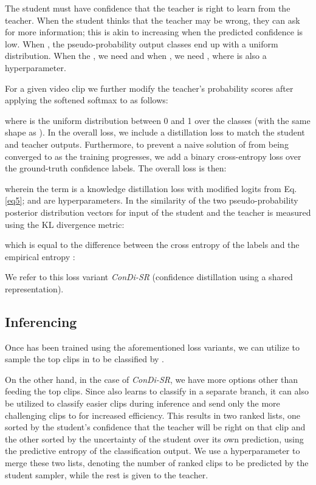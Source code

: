 \documentclass[a4paper,conference]{IEEEtran}
\begin{document}
The student must have confidence that the teacher is right to learn from the teacher. When the student thinks that the teacher may be wrong, they can ask for more information; this is akin to increasing  when the predicted confidence is low. When , the pseudo-probability output classes end up with a uniform distribution. When the , we need  and when , we need , where  is also a hyperparameter.

For a given video clip  we further modify the teacher's probability scores after applying the softened softmax to  as follows:




where  is the uniform distribution between 0 and 1 over the  classes (with the same shape as ). In the overall loss, we include a distillation loss  to match the student and teacher outputs. Furthermore, to prevent a naive solution of  from being converged to as the training progresses, we add a binary cross-entropy loss  over the ground-truth confidence labels. The overall loss is then:



wherein the  term is a knowledge distillation loss with modified logits from Eq. \ref{eq5};  and  are hyperparameters. In  the similarity of the two pseudo-probability posterior distribution vectors for input  of the student and the teacher is measured using the KL divergence metric:




which is equal to the difference between the cross entropy of the labels  and the empirical entropy :



We refer to this loss variant \textit{ConDi-SR} (confidence distillation using a shared representation).

\subsection{Inferencing}
\label{algorithmdetails}

Once  has been trained using the aforementioned loss variants, we can utilize  to sample the top  clips in  to be classified by .

On the other hand, in the case of \textit{ConDi-SR}, we have more options other than feeding the top  clips. Since  also learns to classify in a separate branch, it can also be utilized to classify easier clips during inference and send only the more challenging clips to  for increased efficiency. This results in two ranked lists, one sorted by the student's confidence that the teacher will be right on that clip and the other sorted by the uncertainty of the student over its own prediction, using the predictive entropy of the classification output. We use a hyperparameter  to merge these two lists, denoting the number of ranked clips to be predicted by the student sampler, while the rest  is given to the teacher.  
\end{document}
